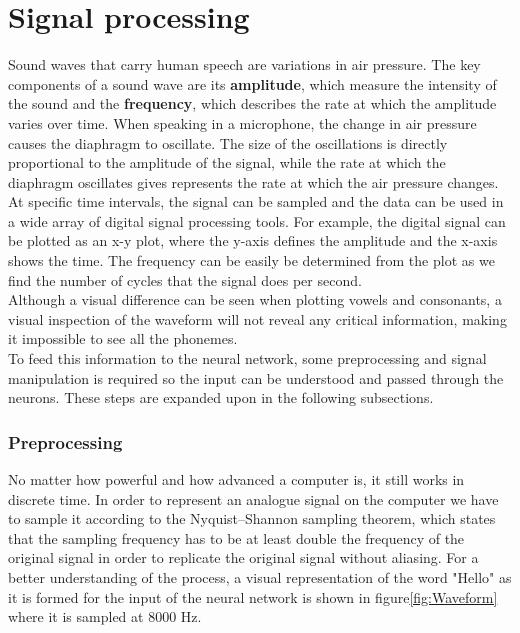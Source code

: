 \section{Signal processing}

Sound waves that carry human speech are variations in air pressure.
The key components of a sound wave are its \textbf{amplitude},
which measure the intensity of the sound and the \textbf{frequency}, which describes the rate at which the amplitude varies over time.
When speaking in a microphone,
the change in air pressure causes the diaphragm to oscillate.
The size of the oscillations is directly proportional to the amplitude of the signal,
while the rate at which the diaphragm oscillates gives represents the rate at which the air pressure changes.
At specific time intervals,
the signal can be sampled and the data can be used in a wide array of digital signal processing tools.
For example, the digital signal can be plotted as an x-y plot,
where the y-axis defines the amplitude and the x-axis shows the time.
The frequency can be easily be determined from the plot as we find the number of cycles that the signal does per second.\\

Although a visual difference can be seen when plotting vowels and consonants,
a visual inspection of the waveform will not reveal any critical information, making it impossible to see all the phonemes.\\

To feed this information to the neural network, some preprocessing and signal manipulation is required so the input can be understood and passed through the neurons.
These steps are expanded upon in the following subsections.

\subsubsection{ Preprocessing}

No matter how powerful and how advanced a computer is,
it still works in discrete time.
In order to represent an analogue signal on the computer we have to sample it according to the Nyquist–Shannon sampling theorem,
which states that the sampling frequency has to be at least double the frequency of the original signal in order to replicate the original signal without aliasing.
For a better understanding of the process, a visual representation of the word "Hello" as it is formed for the input of the neural network is shown in figure\ref{fig:Waveform} where it is sampled at 8000 Hz.

